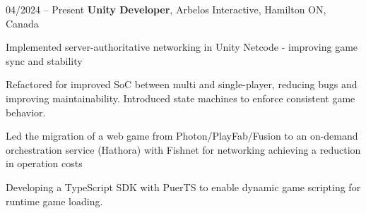 \begin{twocolentry}{
    04/2024 – Present
}
   \textbf{Unity Developer}, Arbelos Interactive, Hamilton ON, Canada \end{twocolentry}

\vspace{0.10 cm}
\begin{onecolentry}
   \begin{highlights}
       \item  Implemented server-authoritative networking in Unity Netcode - improving game sync and stability
       \item Refactored for improved SoC between multi and single-player, reducing bugs and improving maintainability. Introduced state machines to enforce consistent game behavior.
       \item Led the migration of a web game from Photon/PlayFab/Fusion to an on-demand orchestration service (Hathora) with Fishnet for networking achieving a reduction in operation costs
       \item Developing a TypeScript SDK with PuerTS to enable dynamic game scripting for runtime game loading.  
   \end{highlights}
\end{onecolentry}